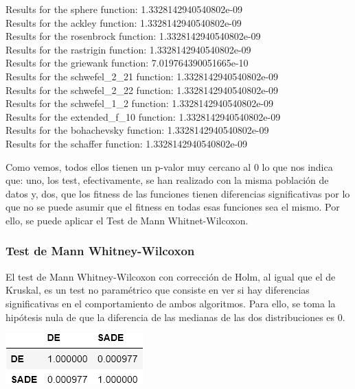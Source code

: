 \documentclass[11pt, a4paper, titlepage]{article}
\begin{document}
\vspace{5mm}

Results for the sphere function: 1.3328142940540802e-09\\
Results for the ackley function: 1.3328142940540802e-09\\
Results for the rosenbrock function: 1.3328142940540802e-09\\
Results for the rastrigin function: 1.3328142940540802e-09\\
Results for the griewank function: 7.019764390051665e-10\\
Results for the schwefel\_2\_21 function: 1.3328142940540802e-09\\
Results for the schwefel\_2\_22 function: 1.3328142940540802e-09\\
Results for the schwefel\_1\_2 function: 1.3328142940540802e-09\\
Results for the extended\_f\_10 function: 1.3328142940540802e-09\\
Results for the bohachevsky function: 1.3328142940540802e-09\\
Results for the schaffer function: 1.3328142940540802e-09\\

\vspace{5mm}

Como vemos, todos ellos tienen un p-valor muy cercano al 0 lo que nos indica que: uno, los test, efectivamente, se han realizado con la %
misma población de datos y, dos, que los fitness de las funciones tienen diferencias significativas por lo que no se puede asumir que el fitness en todas esas funciones sea el mismo. Por ello, se puede aplicar el Test de Mann Whitnet-Wilcoxon.
\newpage
\subsubsection{Test de Mann Whitney-Wilcoxon}
\vspace{5mm}
El test de Mann Whitney-Wilcoxon con corrección de Holm, al igual que el de Kruskal, es un test no paramétrico que consiste en ver si hay diferencias significativas en el comportamiento de ambos algoritmos. Para ello, se toma la hipótesis nula de que la diferencia de las medianas de las dos distribuciones es 0.

\vspace{5mm}

\begin{center}
\includegraphics[scale=0.85]{tableWhitney.png}
\end{center}
\end{document}
